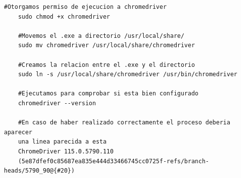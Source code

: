 \begin{lstlisting}[caption={Instrucciones por consola para la configuración de chromedriver en Debian}, label=cod:46]
	#Otorgamos permiso de ejecucion a chromedriver
	sudo chmod +x chromedriver
	
	#Movemos el .exe a directorio /usr/local/share/
	sudo mv chromedriver /usr/local/share/chromedriver
	
	#Creamos la relacion entre el .exe y el directorio
	sudo ln -s /usr/local/share/chromedriver /usr/bin/chromedriver
	
	#Ejecutamos para comprobar si esta bien configurado
	chromedriver --version
	
	#En caso de haber realizado correctamente el proceso deberia aparecer
	una linea parecida a esta
	ChromeDriver 115.0.5790.110
	(5e87dfef0c85687ea835e444d33466745cc0725f-refs/branch-heads/5790_90@{#20})
\end{lstlisting}

